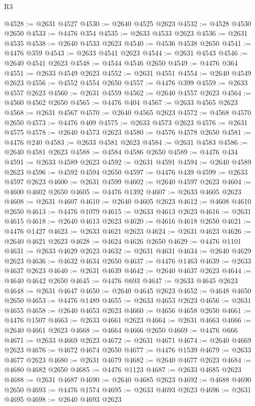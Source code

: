 \begin{lexlean}{R3}
\begin{coremodule}
@4528 := @2631 @4527
@4530 := @2640 @4525 @2623
@4532 := @4528 @4530 @2650
@4533 := @4476 @354
@4535 := @2633 @4533 @2623
@4536 := @2631 @4535
@4538 := @2640 @4533 @2623
@4540 := @4536 @4538 @2650
@4541 := @4476 @359
@4543 := @2633 @4541 @2623
@4544 := @2631 @4543
@4546 := @2640 @4541 @2623
@4548 := @4544 @4546 @2650
@4549 := @4476 @364
@4551 := @2633 @4549 @2623
@4552 := @2631 @4551
@4554 := @2640 @4549 @2623
@4556 := @4552 @4554 @2650
@4557 := @4476 @399
@4559 := @2633 @4557 @2623
@4560 := @2631 @4559
@4562 := @2640 @4557 @2623
@4564 := @4560 @4562 @2650
@4565 := @4476 @404
@4567 := @2633 @4565 @2623
@4568 := @2631 @4567
@4570 := @2640 @4565 @2623
@4572 := @4568 @4570 @2650
@4573 := @4476 @409
@4575 := @2633 @4573 @2623
@4576 := @2631 @4575
@4578 := @2640 @4573 @2623
@4580 := @4576 @4578 @2650
@4581 := @4476 @240
@4583 := @2633 @4581 @2623
@4584 := @2631 @4583
@4586 := @2640 @4581 @2623
@4588 := @4584 @4586 @2650
@4589 := @4476 @434
@4591 := @2633 @4589 @2623
@4592 := @2631 @4591
@4594 := @2640 @4589 @2623
@4596 := @4592 @4594 @2650
@4597 := @4476 @439
@4599 := @2633 @4597 @2623
@4600 := @2631 @4599
@4602 := @2640 @4597 @2623
@4604 := @4600 @4602 @2650
@4605 := @4476 @1392
@4607 := @2633 @4605 @2623
@4608 := @2631 @4607
@4610 := @2640 @4605 @2623
@4612 := @4608 @4610 @2650
@4613 := @4476 @1079
@4615 := @2633 @4613 @2623
@4616 := @2631 @4615
@4618 := @2640 @4613 @2623
@4620 := @4616 @4618 @2650
@4621 := @4476 @1427
@4623 := @2633 @4621 @2623
@4624 := @2631 @4623
@4626 := @2640 @4621 @2623
@4628 := @4624 @4626 @2650
@4629 := @4476 @1101
@4631 := @2633 @4629 @2623
@4632 := @2631 @4631
@4634 := @2640 @4629 @2623
@4636 := @4632 @4634 @2650
@4637 := @4476 @1463
@4639 := @2633 @4637 @2623
@4640 := @2631 @4639
@4642 := @2640 @4637 @2623
@4644 := @4640 @4642 @2650
@4645 := @4476 @693
@4647 := @2633 @4645 @2623
@4648 := @2631 @4647
@4650 := @2640 @4645 @2623
@4652 := @4648 @4650 @2650
@4653 := @4476 @1489
@4655 := @2633 @4653 @2623
@4656 := @2631 @4655
@4658 := @2640 @4653 @2623
@4660 := @4656 @4658 @2650
@4661 := @4476 @1507
@4663 := @2633 @4661 @2623
@4664 := @2631 @4663
@4666 := @2640 @4661 @2623
@4668 := @4664 @4666 @2650
@4669 := @4476 @666
@4671 := @2633 @4669 @2623
@4672 := @2631 @4671
@4674 := @2640 @4669 @2623
@4676 := @4672 @4674 @2650
@4677 := @4476 @1539
@4679 := @2633 @4677 @2623
@4680 := @2631 @4679
@4682 := @2640 @4677 @2623
@4684 := @4680 @4682 @2650
@4685 := @4476 @1123
@4687 := @2633 @4685 @2623
@4688 := @2631 @4687
@4690 := @2640 @4685 @2623
@4692 := @4688 @4690 @2650
@4693 := @4476 @1574
@4695 := @2633 @4693 @2623
@4696 := @2631 @4695
@4698 := @2640 @4693 @2623

\end{coremodule}
\end{lexlean}
